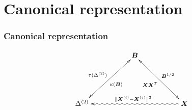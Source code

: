 \documentclass[professionalfonts,hyperref={colorlinks=true,linkcolor=red}]{beamer}
\begin{document}
\section{Canonical representation}
\begin{frame}[label=canonical_representation]
  \frametitle{Canonical representation}
  \begin{exampleblock}{}
    \begin{equation*}
      \xymatrix{
        & & \bm{B} \ar@{<->}[ddll]^{\kappa(\bm{B})}_{\tau(\Delta^{(2)})}
        \ar@{<->}[ddrr]^{\bm{B}^{1/2}}_{\bm{X}\bm{X}^{T}} & &\\ 
        \\
        \Delta^{(2)} \ar@{<~}[rrrr]^{\|\bm{X}^{(i)} -
          \bm{X}^{(j)}\|^{2}} & & & & \bm{X} 
      }
    \end{equation*}
  \end{exampleblock}
\end{frame}
\end{document}
